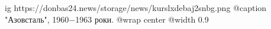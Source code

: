  
 
 
 
 

\ifcmt
  ig https://donbas24.news/storage/news/kurslxdebaj2snbg.png
	@caption "Азовсталь", 1960−1963 роки.
  @wrap center
  @width 0.9
\fi
